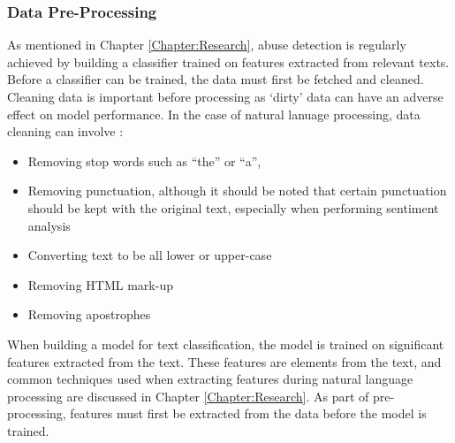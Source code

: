 \subsubsection{Data Pre-Processing}
As mentioned in Chapter \ref{Chapter:Research}, abuse detection is regularly achieved by building a classifier trained on features extracted from relevant texts. Before a classifier can be trained, the data must first be fetched and cleaned. Cleaning data is important before processing as `dirty' data can have an adverse effect on model performance. In the case of natural lanuage processing, data cleaning can involve \cite{han2011data}:
\begin{itemize}
\item Removing stop words such as ``the'' or ``a'', 
\item Removing punctuation, although it should be noted that certain punctuation should be kept with the original text, especially when performing sentiment analysis
\item Converting text to be all lower or upper-case
\item Removing HTML mark-up
\item Removing apostrophes
\end{itemize}

When building a model for text classification, the model is trained on significant features extracted from the text. These features are elements from the text, and common techniques used when extracting features during natural language processing are discussed in Chapter \ref{Chapter:Research}. As part of pre-processing, features must first be extracted from the data before the model is trained.


